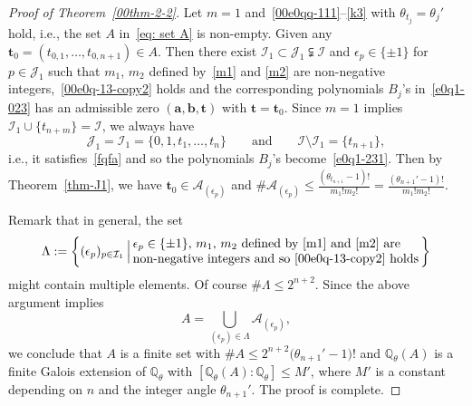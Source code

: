 \documentclass[pdftex]{sigma}
\numberwithin{equation}{section}
\def\Q{\mathbb Q}
\begin{document}
\begin{proof}[Proof of Theorem~\ref{00thm-2-2}]
Let $m=1$ and~\eqref{00e0qq-111}--\eqref{k3} with
$\theta_{t_j}=\theta_j'$ hold, i.e., the set $A$ in~\eqref{eq: set A}
is non-empty.
Given any $\boldsymbol t_0=(t_{0,1},\dots,t_{0,n+1})\in A$. Then
there exist
$\mathcal{I}_1\subset\mathcal{J}_1\subsetneqq \mathcal{I}$ and $\epsilon_p\in \{\pm 1\}$ for $p\in\mathcal{J}_1$ such that $m_1$, $m_2$ defined by~\eqref{m1} and \eqref{m2} are non-negative integers,~\eqref{00e0q-13-copy2} holds and the corresponding polynomials $B_j$'s in~\eqref{e0q1-023} has an admissible zero $(\boldsymbol a,\boldsymbol b,\boldsymbol t)$ with $\boldsymbol t=\boldsymbol t_0$.
Since $m=1$ implies $\mathcal{I}_1\cup\{t_{n+m}\}=\mathcal{I}$, we always have
\[\mathcal{J}_1=\mathcal{I}_1=\{0,1,t_1,\dots,t_n\}\qquad \text{and}\qquad\mathcal{I}\setminus \mathcal{I}_1=\{t_{n+1}\},\]
i.e., it satisfies~\eqref{fqfa} and so the polynomials $B_j$'s become~\eqref{e0q1-231}. Then by Theorem~\ref{thm-J1}, we have $\boldsymbol t_0\in\mathcal{A}_{(\epsilon_p)}$ and $\#\mathcal{A}_{(\epsilon_p)}\leq \frac{(\theta_{t_{n+1}}-1)!}{m_1!m_2!}=\frac{(\theta_{n+1}'-1)!}{m_1!m_2!}.$

Remark that in general, the set
\[
 \Lambda:=\left\{(\epsilon_p)_{p\in\mathcal{I}_1}\,\Big|\,
 \begin{array}{@{}lll@{}}\text{$\epsilon_p\in\{\pm 1\}$, $m_1$, $m_2$ defined by~\eqref{m1} and \eqref{m2} are}\\
 \text{non-negative integers and so~\eqref{00e0q-13-copy2} holds}
 \end{array}\!\!\right\}
\]
might contain multiple elements. Of course $\#\Lambda\leq
2^{n+2}$. Since the above argument implies
\[A=\bigcup\limits_{(\epsilon_p)\in \Lambda}\mathcal{A}_{(\epsilon_p)},\]
we conclude that $A$ is a finite set with $\# A\leq
2^{n+2}\bigl(\theta_{n+1}'-1\bigr)!$ and $\Q_\theta(A)$ is a finite Galois
 extension of $\Q_\theta$ with $[\Q_\theta(A):\Q_\theta]\leq M'$,
 where $M'$ is a constant depending on $n$ and the integer angle
 $\theta_{n+1}'$. The proof is complete.
\end{proof}




\end{document}
